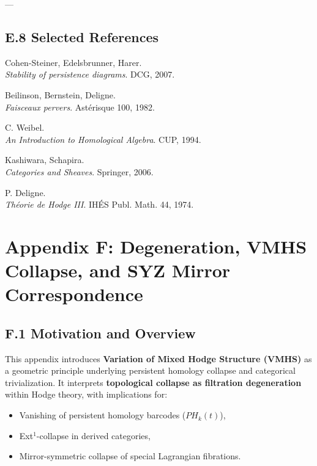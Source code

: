 \documentclass[11pt]{article}
\begin{document}
---

\subsection*{E.8 Selected References}

\begin{thebibliography}{9}

Cohen-Steiner, Edelsbrunner, Harer.\\
\textit{Stability of persistence diagrams}. DCG, 2007.

Beilinson, Bernstein, Deligne.\\
\textit{Faisceaux pervers}. Astérisque 100, 1982.

C. Weibel.\\
\textit{An Introduction to Homological Algebra}. CUP, 1994.

Kashiwara, Schapira.\\
\textit{Categories and Sheaves}. Springer, 2006.

P. Deligne.\\
\textit{Théorie de Hodge III}. IHÉS Publ. Math. 44, 1974.

\end{thebibliography}



\section*{Appendix F: Degeneration, VMHS Collapse, and SYZ Mirror Correspondence}

\subsection*{F.1 Motivation and Overview}

This appendix introduces \textbf{Variation of Mixed Hodge Structure (VMHS)} as a geometric principle  
underlying persistent homology collapse and categorical trivialization.  
It interprets \textbf{topological collapse as filtration degeneration} within Hodge theory, with implications for:

\begin{itemize}
  \item Vanishing of persistent homology barcodes ($PH_k(t)$),
  \item Ext$^1$-collapse in derived categories,
  \item Mirror-symmetric collapse of special Lagrangian fibrations.
\end{itemize}
\end{document}
